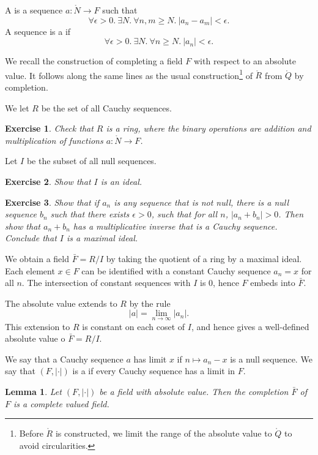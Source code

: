 \documentclass{amsart}
\newtheorem{lemma}[equation]{Lemma}
\newtheorem{exercise}{Exercise}
\def\abs#1{{|#1|}}
\begin{document}
A  is a sequence $a:\ring{N}\to F$ such that
\[
\forall \epsilon>0.~ \exists N.~\forall n,m \ge N.~ |a_n - a_m|<\epsilon.
\]
A sequence is a  if
\[
\forall\epsilon>0.~\exists N.~\forall n\ge N.~|a_n|<\epsilon.
\]

We recall the construction of completing a field $F$ with respect to
an absolute value.  It follows along the same lines as the usual
construction\footnote{Before $\ring{R}$ is constructed, we limit the
  range of the absolute value to $\ring{Q}$ to avoid circularities.}
of $\ring{R}$ from $\ring{Q}$ by completion.


We let $R$ be the set of all Cauchy sequences. 

\begin{exercise} Check that $R$ is a ring, where the binary operations
  are addition and multiplication of functions $a:\ring{N}\to F$.
\end{exercise}

Let $I$ be the subset
of all null sequences.  

\begin{exercise} Show that $I$ is an ideal.
\end{exercise}

\begin{exercise} 
Show that if $a_n$ is any sequence that is not null, there is a null sequence $b_n$
such that there exists $\epsilon>0$, such that for all $n$, $\abs{a_n+b_n}>0$.
Then show that $a_n+b_n$ has a multiplicative inverse that is a Cauchy sequence.
Conclude that $I$ is a maximal ideal.
\end{exercise}

We obtain a field $\bar F = R/I$ by taking the quotient of a ring by a maximal ideal.
Each element $x\in F$ can be identified with a constant Cauchy sequence $a_n=x$ for all 
$n$.  The intersection of constant sequences with $I$ is $0$, hence $F$ embeds into $\bar F$.

The absolute value extends to $R$ by the rule
\[
\abs{a} = \lim_{n\to\infty} |a_n|.
\]
This extension to $R$ is constant on each coset of $I$, and hence gives a well-defined
absolute value o $\bar F = R/I$.

We say that a Cauchy sequence $a$ has limit $x$ if $n\mapsto a_n-x$ is a null sequence.
We say that $(F,\abs{\cdot})$ is a  if every Cauchy
sequence has a limit in $F$.

\begin{lemma}  Let $(F,\abs{\cdot})$ be a field with absolute value.
Then the completion $\bar F$ of $F$ is a complete valued field.
\end{lemma}
\end{document}
